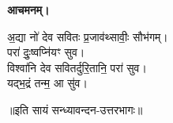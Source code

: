 \textbf{आचमनम्।}


अ॒द्या नो॑ देव सवितः प्र॒जाव॑थ्सावीः॒ सौभ॑गम्।\\
परा॑ दुः॒ष्वप्नि॑यꣳ सुव।\\
विश्वा॑नि देव सवितर्दुरि॒तानि॒ परा॑ सुव।\\
यद्भ॒द्रं तन्म॒ आ सु॑व।

\centerline{॥इति सायं सन्ध्यावन्दन-उत्तरभागः॥}
 
















